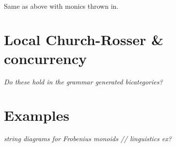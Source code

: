 \documentclass{amsart}
\begin{document}
\begin{thm}
	Same as above with monics thrown in.
\end{thm}

\section{Local Church-Rosser \& concurrency}

{\color{red}\emph{Do these hold in the grammar generated bicategories?}}

\section{Examples}

{\color{red}\emph{string diagrams for Frobenius monoids // linguistics ex?}}
\end{document}
